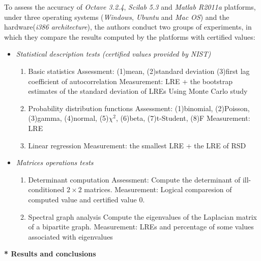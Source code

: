 \documentclass[conference,onecolumn]{IEEEtran}
\begin{document}
To assess the accuracy of \textit{Octave 3.2.4}, \textit{Scilab 5.3} and \textit{Matlab R2011a} platforms, under three operating systems (\textit{Windows}, \textit{Ubuntu} and \textit{Mac OS}) and the hardware(\textit{i386 architecture}), the authors conduct two groups of experiments, in which they compare the results computed by the platforms with certified values:
\begin{itemize}
	\item \textit{Statistical description tests (certified values provided by NIST)}
	\begin{enumerate}
		\item Basic statistics
		\subitem Assessment: (1)mean, (2)standard deviation (3)first lag coefficient of autocorrelation
		\subitem Measurement: LRE + the bootstrap estimates of the standard deviation of LREs
		\subitem Using Monte Carlo study
		
		\item Probability distribution functions
		\subitem Assessment: (1)binomial, (2)Poisson, (3)gamma, (4)normal, (5)$\chi^2$, (6)beta, (7)t-Student, (8)F
		\subitem Measurement: LRE
		
		\item Linear regression
		\subitem Measurement: the smallest LRE + the LRE of RSD
	\end{enumerate}
				
	\item \textit{Matrices operations tests}
	\begin{enumerate}
		\item Determinant computation
		\subitem Assessment: Compute the determinant of ill-conditioned $2\times 2$ matrices.
		\subitem Measurement: Logical comparesion of computed value and certified value 0.
		
		\item Spectral graph analysis
		\subitem Compute the eigenvalues of the Laplacian matrix of a bipartite graph.
		\subitem Measurement: LREs and percentage of some values associated with eigenvalues
	\end{enumerate}	
\end{itemize}

\textbf{* Results and conclusions}
\end{document}
